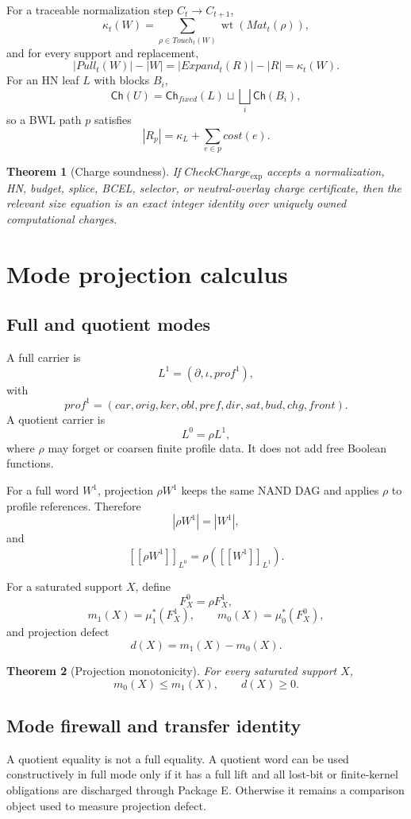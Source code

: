 \documentclass[10.5pt,a4paper]{article}
\newtheorem{theorem}{Theorem}[section]
\newcommand{\Ch}{\mathsf{Ch}}
\newcommand{\wt}{\operatorname{wt}}
\begin{document}
For a traceable normalization step \(C_t\to C_{t+1}\),
\[
\kappa_t(W)=\sum_{\rho\in Touch_t(W)}\wt(Mat_t(\rho)),
\]
and for every support and replacement,
\[
|Pull_t(W)|-|W|=|Expand_t(R)|-|R|=\kappa_t(W).
\]
For an HN leaf \(L\) with blocks \(B_i\),
\[
\Ch(U)=\Ch_{fixed}(L)\sqcup\bigsqcup_i\Ch(B_i),
\]
so a BWL path \(p\) satisfies
\[
|R_p|=\kappa_L+\sum_{e\in p}cost(e).
\]

\begin{theorem}[Charge soundness]
If \(CheckCharge_{\exp}\) accepts a normalization, HN, budget, splice, BCEL, selector, or neutral-overlay charge certificate, then the relevant size equation is an exact integer identity over uniquely owned computational charges.
\end{theorem}

\section{Mode projection calculus}

\subsection{Full and quotient modes}
A full carrier is
\[
L^1=(\partial,\iota,prof^1),
\]
with
\[
prof^1=(car,orig,ker,obl,pref,dir,sat,bud,chg,front).
\]
A quotient carrier is
\[
L^0=\rho L^1,
\]
where \(\rho\) may forget or coarsen finite profile data. It does not add free Boolean functions.

For a full word \(W^1\), projection \(\rho W^1\) keeps the same NAND DAG and applies \(\rho\) to profile references. Therefore
\[
|\rho W^1|=|W^1|,
\]
and
\[
[[\rho W^1]]_{L^0}=\rho([[W^1]]_{L^1}).
\]

For a saturated support \(X\), define
\[
F_X^0=\rho F_X^1,
\]
\[
m_1(X)=\mu_1^*(F_X^1),\qquad m_0(X)=\mu_0^*(F_X^0),
\]
and projection defect
\[
d(X)=m_1(X)-m_0(X).
\]

\begin{theorem}[Projection monotonicity]
For every saturated support \(X\),
\[
m_0(X)\le m_1(X),\qquad d(X)\ge0.
\]
\end{theorem}

\subsection{Mode firewall and transfer identity}
A quotient equality is not a full equality. A quotient word can be used constructively in full mode only if it has a full lift and all lost-bit or finite-kernel obligations are discharged through Package E. Otherwise it remains a comparison object used to measure projection defect.
\end{document}
